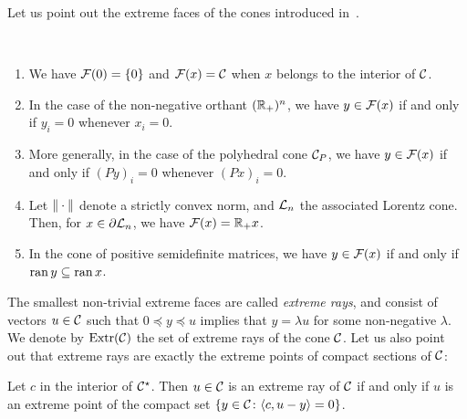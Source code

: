 \documentclass[main]{subfiles}
\begin{document}
Let us point out the extreme faces of the cones introduced in~.

\begin{example}~
\begin{enumerate}
\item We have $\mathcal{F}(0) = \{0\}$ and  $\mathcal{F}(x) = \mathcal{C}$ when $x$ belongs to the interior of $\mathcal{C}$.
\item In the case of the non-negative orthant $(\mathbb{R}_+)^n$, we have $y \in \mathcal{F}(x)$ if and only if $y_i = 0$ whenever $x_i = 0$. 
\item More generally, in the case of the polyhedral cone $\mathcal{C}_P$, we have $y \in \mathcal{F}(x)$ if and only if $(Py)_i = 0$ whenever $(Px)_i = 0$.
\item Let $\| \cdot \|$ denote a strictly convex norm, and $\mathcal{L}_n$ the associated Lorentz cone. Then, for $x \in \partial\mathcal{L}_n$, we have $\mathcal{F}(x) = \mathbb{R}_+ x$.
\item In the cone of positive semidefinite matrices, we have $y \in \mathcal{F}(x)$ if and only if $\operatorname{ran} y \subseteq \operatorname{ran} x$.
\end{enumerate}
\end{example}


 

The smallest non-trivial extreme faces are called \emph{extreme rays}, and consist of  vectors $u \in \mathcal{C}$ such that $0 \preceq y \preceq u$ implies that $y = \lambda u$ for some non-negative $\lambda$.
We denote by $\operatorname{Extr}(\mathcal{C})$ the set of extreme rays of the cone $\mathcal{C}$.
Let us also point out that extreme rays are exactly the extreme points of compact sections of $\mathcal{C}$:
\begin{lemma}%
\label{lem:ray_extr_sect}
Let $c$ in the interior of $\mathcal{C}^\star$.
Then $u \in \mathcal{C}$ is an extreme ray of $\mathcal{C} $ if and only if $u$ is an extreme point of the compact set $\{ y \in \mathcal{C} \colon \langle {c} , {u-y} \rangle = 0 \}$.
\end{lemma}
\end{document}
